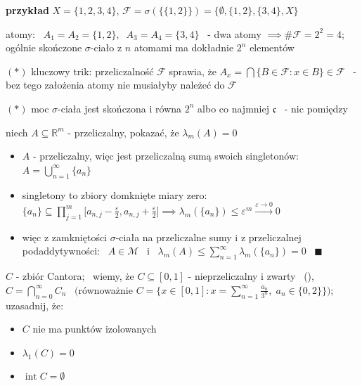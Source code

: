 \documentclass[a4paper,12pt]{article}
\begin{document}
\bigskip
\begin{logbox}
\textbf{przykład} \; \(X = \{1, 2, 3, 4\}\), \; \(\mathcal{F} = \sigma(\{\{1, 2\}\}) = \{\emptyset, \{1, 2\}, \{3, 4\}, X\}\)

\smallskip
atomy: \, \(A_1 = A_2 = \{1, 2\}, \;\; A_3 = A_4 = \{3, 4\}\) \, - dwa atomy \(\implies \#\mathcal{F} = 2^2 = 4\); \; ogólnie skończone \(\sigma\)-ciało z \(n\) atomami ma dokładnie \(2^n\) elementów
\end{logbox}

\smallskip
\((*)\) \; kluczowy trik: przeliczalność \(\mathcal{F}\) sprawia, że \(A_x = \bigcap \{B \in \mathcal{F} : x \in B\} \in \mathcal{F}\) \, - bez tego założenia atomy nie musiałyby należeć do \(\mathcal{F}\)

\smallskip
\((*)\) \; moc \(\sigma\)-ciała jest skończona i równa \(2^n\) albo co najmniej \(\mathfrak{c}\) \, - nic pomiędzy

\newpage
{}

\bigskip
{} \; niech \(A \subseteq \mathbb{R}^m\) - przeliczalny, \; pokazać, że \(\lambda_m(A) = 0\)
\begin{itemize}
    \item \(A\) - przeliczalny, więc jest przeliczalną sumą swoich singletonów: \, \(A = \bigcup_{n=1}^{\infty} \{a_n\}\)
    \item singletony to zbiory domknięte miary zero: \, \(\{a_n\} \subseteq \prod_{j=1}^{m} \big[a_{n,j} - \frac{\varepsilon}{2}, a_{n,j} + \frac{\varepsilon}{2}\big] \implies \lambda_m(\{a_n\}) \leq \varepsilon^m \xrightarrow{\varepsilon \to 0} 0\)
    \item więc z zamkniętości \(\sigma\)-ciała na przeliczalne sumy i z przeliczalnej podaddytywności: \, \(A \in \mathcal{M}\) \, i \, \(\lambda_m(A) \leq \sum_{n=1}^{\infty} \lambda_m(\{a_n\}) = 0\) \, \(\blacksquare\)
\end{itemize}

\bigskip
{} \; \(C\) - zbiór Cantora; \, wiemy, że \(C \subseteq [0, 1]\) - nieprzeliczalny i zwarty \, (), \; \(C = \bigcap_{n=0}^{\infty} C_n\) \, \(\big(\)równoważnie \(C = \{x \in [0, 1] : x = \sum_{n=1}^{\infty} \frac{a_n}{3^n}, \; a_n \in \{0, 2\}\}\big)\); \; uzasadnij, że:
\begin{itemize}
    \item \(C\) nie ma punktów izolowanych
    \item \(\lambda_1(C) = 0\)
    \item \(\operatorname{int} C = \emptyset\)
\end{itemize}
\end{document}
